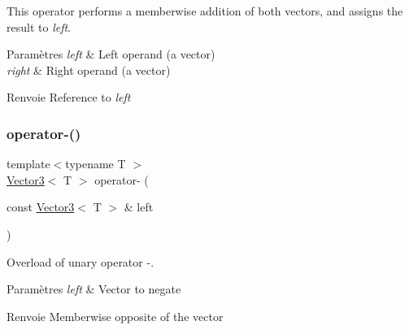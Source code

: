 This operator performs a memberwise addition of both vectors, and assigns the result to {\itshape left}.


\begin{DoxyParams}{Paramètres}
{\em left} & Left operand (a vector) \\
\hline
{\em right} & Right operand (a vector)\\
\hline
\end{DoxyParams}
\begin{DoxyReturn}{Renvoie}
Reference to {\itshape left} 
\end{DoxyReturn}
\mbox{\label{classsf_1_1Vector3_a9b75d2fb9b0f2fd9fe33f8f06f9dda75}} 
\subsubsection{\texorpdfstring{operator-\/()}{operator-()}\hspace{0.1cm}{\footnotesize\ttfamily [1/2]}}
{\footnotesize\ttfamily template$<$typename T $>$ \\
\hyperlink{classsf_1_1Vector3}{Vector3}$<$ T $>$ operator-\/ (\begin{DoxyParamCaption}\item[{const \hyperlink{classsf_1_1Vector3}{Vector3}$<$ T $>$ \&}]{left }\end{DoxyParamCaption})\hspace{0.3cm}{\ttfamily [related]}}



Overload of unary operator -\/. 


\begin{DoxyParams}{Paramètres}
{\em left} & Vector to negate\\
\hline
\end{DoxyParams}
\begin{DoxyReturn}{Renvoie}
Memberwise opposite of the vector 
\end{DoxyReturn}
\mbox{\label{classsf_1_1Vector3_abe0b9411c00cf807bf8a5f835874bd2a}} 
